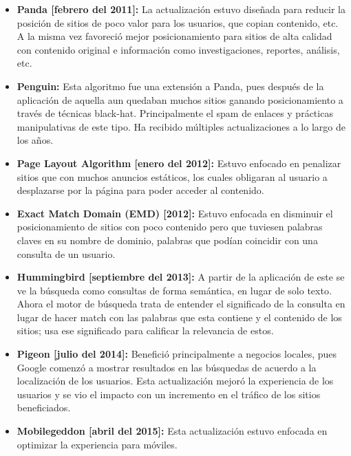 \documentclass[12pt]{article}
\begin{document}
\begin{itemize}

\item \textbf{Panda [febrero del 2011]:} La actualización estuvo diseñada para reducir la posición de sitios de poco valor para los usuarios, que copian contenido, etc. A la misma vez favoreció mejor posicionamiento para sitios de alta calidad con contenido original e información como investigaciones, reportes, análisis, etc. \cite{panda}

\item \textbf{Penguin:} Esta algoritmo fue una extensión a Panda, pues después de la aplicación de aquella aun quedaban muchos sitios ganando posicionamiento a través de técnicas black-hat. Principalmente el spam de enlaces y prácticas manipulativas de este tipo. Ha recibido múltiples actualizaciones a lo largo de los años. \cite{penguin}

\item \textbf{Page Layout Algorithm [enero del 2012]:} Estuvo enfocado en penalizar sitios que con muchos anuncios estáticos, los cuales obligaran al usuario a desplazarse por la página para poder acceder al contenido.

\item \textbf{Exact Match Domain (EMD) [2012]:} Estuvo enfocada en disminuir el posicionamiento de sitios con poco contenido pero que tuviesen palabras claves en su nombre de dominio, palabras que podían coincidir con una consulta de un usuario.

\item \textbf{Hummingbird [septiembre del 2013]:} A partir de la aplicación de este se ve la búsqueda como consultas de forma semántica, en lugar de solo texto. Ahora el motor de búsqueda trata de entender el significado de la consulta en lugar de hacer match con las palabras que esta contiene y el contenido de los sitios; usa ese significado para calificar la relevancia de estos.

\item \textbf{Pigeon [julio del 2014]:} Benefició principalmente a negocios locales, pues Google comenzó a mostrar resultados en las búsquedas de acuerdo a la localización de los usuarios. Esta actualización mejoró la experiencia de los usuarios y se vio el impacto con un incremento en el tráfico de los sitios beneficiados.

\item \textbf{Mobilegeddon [abril del 2015]:} Esta actualización estuvo enfocada en optimizar la experiencia para móviles. \cite{mobilgeddon}


\end{itemize}
\end{document}
